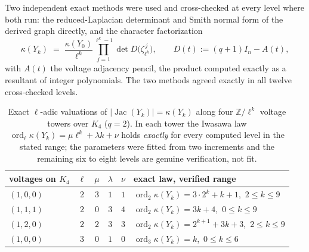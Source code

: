 \documentclass[11pt]{amsart}
\numberwithin{equation}{section}
\theoremstyle{definition}
\theoremstyle{remark}
\newcommand{\Z}{\mathbb{Z}}
\newcommand{\Jac}{\operatorname{Jac}}
\begin{document}
Two independent exact methods were used and cross-checked at every level where both run:
the reduced-Laplacian determinant and Smith normal form of the derived graph directly,
and the character factorization
\[
\kappa(Y_k)\;=\;\frac{\kappa(Y_0)}{\ell^{k}}\prod_{j=1}^{\ell^k-1}
\det D\bigl(\zeta_{\ell^k}^{\,j}\bigr),
\qquad
D(t):=(q+1)I_n-A(t),
\]
with $A(t)$ the voltage adjacency pencil, the product computed exactly as a resultant of
integer polynomials. The two methods agreed exactly in all twelve cross-checked levels.

\begin{table}[ht]
\centering\small
\renewcommand{\arraystretch}{1.2}
\begin{tabular}{lccccl}
\toprule
voltages on $K_4$ & $\ell$ & $\mu$ & $\lambda$ & $\nu$ & exact law, verified range\\
\midrule
$(1,0,0)$ & $2$ & $3$ & $1$ & $1$ & $\operatorname{ord}_2\kappa(Y_k)=3\cdot2^k+k+1$,\ $2\le k\le9$\\
$(1,1,1)$ & $2$ & $0$ & $3$ & $4$ & $\operatorname{ord}_2\kappa(Y_k)=3k+4$,\ $0\le k\le9$\\
$(1,2,0)$ & $2$ & $2$ & $3$ & $3$ & $\operatorname{ord}_2\kappa(Y_k)=2^{k+1}+3k+3$,\ $2\le k\le9$\\
$(1,0,0)$ & $3$ & $0$ & $1$ & $0$ & $\operatorname{ord}_3\kappa(Y_k)=k$,\ $0\le k\le6$\\
\bottomrule
\end{tabular}
\medskip
\caption{Exact $\ell$-adic valuations of $|\Jac(Y_k)|=\kappa(Y_k)$ along four
$\Z/\ell^k$ voltage towers over $K_4$ ($q=2$). In each tower the Iwasawa law
$\operatorname{ord}_\ell\kappa(Y_k)=\mu\ell^k+\lambda k+\nu$ holds \emph{exactly} for
every computed level in the stated range; the parameters were fitted from two increments
and the remaining six to eight levels are genuine verification, not fit.}
\label{tab:tower}
\end{table}
\end{document}
